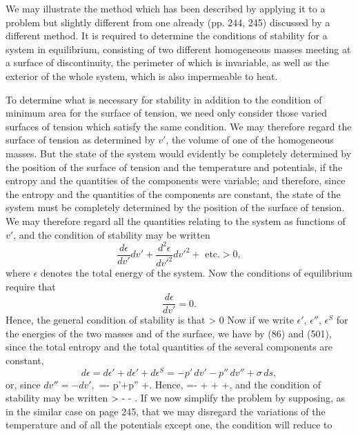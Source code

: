 \documentclass[12pt]{memoir}
\begin{document}
{We may illustrate the method which has been described by applying it to a problem but slightly different from one already (pp. 244, 245) discussed by a different method. It is required to determine the conditions of stability for a system in equilibrium, consisting of two different homogeneous masses meeting at a surface of discontinuity, the perimeter of which is invariable, as well as the exterior of the whole system, which is also impermeable to heat.

To determine what is necessary for stability in addition to the condition of minimum area for the surface of tension, we need only consider those varied surfaces of tension which satisfy the same condition. We may therefore regard the surface of tension as determined by $v'$, the volume of one of the homogeneous masses. But the state of the system would evidently be completely determined by the position of the surface of tension and the temperature and potentials, if the entropy and the quantities of the components were variable; and therefore, since the entropy and the quantities of the components are constant, the state of the system must be completely determined by the position of the surface of tension. We may therefore regard all the quantities relating to the system as functions of $v'$, and the condition of stability may be written
$$\frac{d\epsilon}{dv'}dv'+ \frac{d^2\epsilon}{dv'^2}dv'^2+ \text{ etc.} > 0, $$
where $\epsilon$ denotes the total energy of the system. Now the conditions of equilibrium require that
$$ \frac{d\epsilon}{dv'}=0.$$
Hence, the general condition of stability is that
\eqs {}> 0\label{541}\eqe
Now if we write $\epsilon'$, $\epsilon''$, $\epsilon^S$ for the energies of the two masses and of the surface, we have by (86) and (501), since the total entropy and the total quantities of the several components are constant,
$$ d\epsilon = d\epsilon' + d\epsilon' + d\epsilon^S = -p' \, dv' -p''\, dv'' + \sigma \, ds, $$
or, since $dv''= -dv',$
\eqs {}=- p'+p'' +\sigma {}. \label{542}\eqe
Hence,
\eqs {}=- + + +\sigma {},  \label{543}\eqe
and the condition of stability may be written
\eqs \sigma {}>  - - .  \label{544}\eqe
If we now simplify the problem by supposing, as in the similar case on page 245, that we may disregard the variations of the temperature and of all the potentials except one, the condition will reduce to
}
\end{document}
